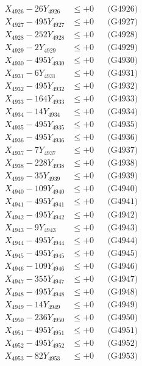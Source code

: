 \documentclass[a4paper,10pt]{article}
\begin{document}
{\begin{align}
X_{4926} - 26Y_{4926} &\leq +0 && \text{(G4926)} \\
X_{4927} - 495Y_{4927} &\leq +0 && \text{(G4927)} \\
X_{4928} - 252Y_{4928} &\leq +0 && \text{(G4928)} \\
X_{4929} - 2Y_{4929} &\leq +0 && \text{(G4929)} \\
X_{4930} - 495Y_{4930} &\leq +0 && \text{(G4930)} \\
\allowbreak
X_{4931} - 6Y_{4931} &\leq +0 && \text{(G4931)} \\
X_{4932} - 495Y_{4932} &\leq +0 && \text{(G4932)} \\
X_{4933} - 164Y_{4933} &\leq +0 && \text{(G4933)} \\
X_{4934} - 14Y_{4934} &\leq +0 && \text{(G4934)} \\
X_{4935} - 495Y_{4935} &\leq +0 && \text{(G4935)} \\
X_{4936} - 495Y_{4936} &\leq +0 && \text{(G4936)} \\
X_{4937} - 7Y_{4937} &\leq +0 && \text{(G4937)} \\
X_{4938} - 228Y_{4938} &\leq +0 && \text{(G4938)} \\
X_{4939} - 35Y_{4939} &\leq +0 && \text{(G4939)} \\
X_{4940} - 109Y_{4940} &\leq +0 && \text{(G4940)} \\
\allowbreak
X_{4941} - 495Y_{4941} &\leq +0 && \text{(G4941)} \\
X_{4942} - 495Y_{4942} &\leq +0 && \text{(G4942)} \\
X_{4943} - 9Y_{4943} &\leq +0 && \text{(G4943)} \\
X_{4944} - 495Y_{4944} &\leq +0 && \text{(G4944)} \\
X_{4945} - 495Y_{4945} &\leq +0 && \text{(G4945)} \\
X_{4946} - 109Y_{4946} &\leq +0 && \text{(G4946)} \\
X_{4947} - 355Y_{4947} &\leq +0 && \text{(G4947)} \\
X_{4948} - 495Y_{4948} &\leq +0 && \text{(G4948)} \\
X_{4949} - 14Y_{4949} &\leq +0 && \text{(G4949)} \\
X_{4950} - 236Y_{4950} &\leq +0 && \text{(G4950)} \\
\allowbreak
X_{4951} - 495Y_{4951} &\leq +0 && \text{(G4951)} \\
X_{4952} - 495Y_{4952} &\leq +0 && \text{(G4952)} \\
X_{4953} - 82Y_{4953} &\leq +0 && \text{(G4953)} \\

\end{align}}
\end{document}
